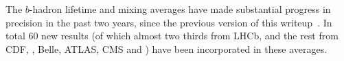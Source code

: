 The $b$-hadron lifetime and mixing averages have made substantial 
progress in precision in the past two years, since the previous 
version of this writeup~\cite{Amhis:2012bh}. In total 60 new results 
(of which almost two thirds from LHCb, and the rest from CDF,
\dzero, Belle, ATLAS, CMS and \babar)
have been incorporated in these averages.
%
%
%
%
%
%
